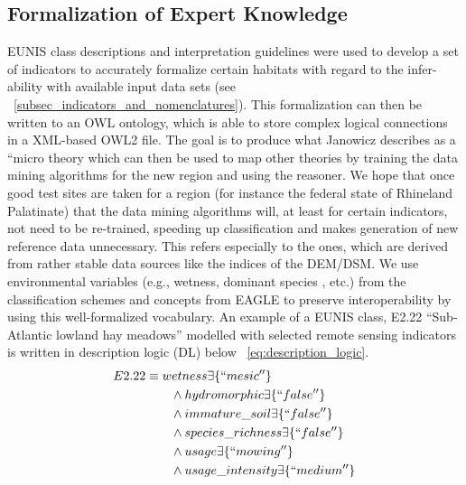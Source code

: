 \documentclass[authoryear, review,12pt,number]{elsarticle}
\begin{document}
\subsection{Formalization of Expert Knowledge}

EUNIS class descriptions and interpretation guidelines \citep{EUNISManual} were
used to develop a set of indicators to accurately formalize certain habitats
with regard to the infer-ability with available input data sets (see
~\ref{subsec_indicators_and_nomenclatures}). This formalization can then be
written to an OWL ontology, which is able to store complex logical connections
in a XML-based OWL2 file. The goal is to produce what Janowicz describes
as a ``micro theory \citep{Janowicz2012} which can then be used to map other
theories by training the data mining algorithms for the new
region and using the reasoner. We hope that once good test sites are taken for 
a region (for instance the federal state of Rhineland Palatinate) that the data 
mining algorithms will, at least for certain indicators, not need to be
re-trained, speeding up classification and makes generation of new reference
data unnecessary. This refers especially to the ones, which are derived from
rather stable data sources like the indices of the DEM/DSM\@. We use environmental
variables (e.g., wetness, dominant species%
, etc.) from the classification schemes and concepts from EAGLE %
to preserve interoperability by using this well-formalized
vocabulary.
 An example of a EUNIS class, E2.22
``Sub-Atlantic lowland hay meadows'' modelled with selected remote sensing
indicators is written in description logic (DL) below
~\ref{eq:description_logic}.
\begin{equation}
\begin{align*}
E2.22 &\equiv wetness \exists \{``mesic''\} \\
&\qquad {} \land hydromorphic \exists \{``false''\} \\
&\qquad {} \land immature\_soil \exists \{``false''\} \\
&\qquad {} \land species\_richness \exists \{``false''\} \\
&\qquad {} \land usage \exists \{``mowing''\} \\
&\qquad {} \land usage\_intensity \exists \{``medium''\} \\
\end{align*}
\label{eq:description_logic}
\end{equation}
\end{document}
